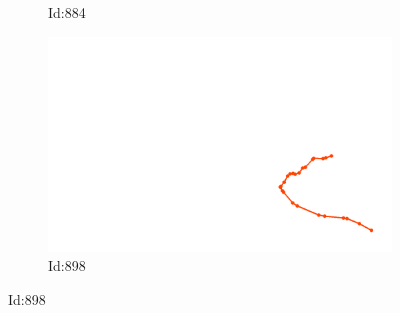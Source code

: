 \documentclass[12pt,twoside]{report}
\begin{document}
\begin{figure}
\begin{subfigure}[b]{0.20\textwidth}
\caption{Id:884}
\end{subfigure}
\begin{subfigure}[b]{0.20\textwidth}
\centering
\includegraphics[width=\textwidth]{../../trajectories/898.png}
\caption{Id:898}
\end{subfigure}
\end{figure}
\end{document}
